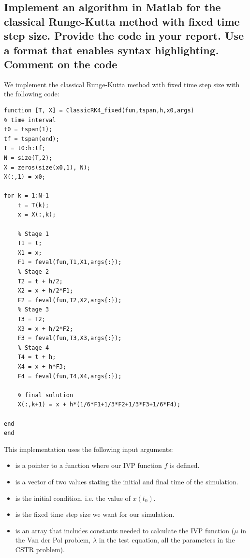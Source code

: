 
\subsection{Implement an algorithm in Matlab for the classical Runge-Kutta method with fixed time step size. Provide the code in your report.  Use a format that enables syntax highlighting. Comment on the code}
We implement the classical Runge-Kutta method with fixed time step size with the following code:
\begin{lstlisting}[caption = Classical Runge-Kutta method with fixed time step size, captionpos=b, label=1_ClassicRK4]
function [T, X] = ClassicRK4_fixed(fun,tspan,h,x0,args)
% time interval
t0 = tspan(1);
tf = tspan(end);
T = t0:h:tf;
N = size(T,2);
X = zeros(size(x0,1), N);
X(:,1) = x0;

for k = 1:N-1
    t = T(k);
    x = X(:,k);

    % Stage 1
    T1 = t;
    X1 = x;
    F1 = feval(fun,T1,X1,args{:});
    % Stage 2
    T2 = t + h/2;
    X2 = x + h/2*F1;
    F2 = feval(fun,T2,X2,args{:});
    % Stage 3
    T3 = T2;
    X3 = x + h/2*F2;
    F3 = feval(fun,T3,X3,args{:});
    % Stage 4
    T4 = t + h;
    X4 = x + h*F3;
    F4 = feval(fun,T4,X4,args{:});

    % final solution
    X(:,k+1) = x + h*(1/6*F1+1/3*F2+1/3*F3+1/6*F4);

end
end
\end{lstlisting}

This implementation uses the following input arguments:
\begin{itemize}
    \item {} is a pointer to a function where our IVP function $f$ is defined.
    \item {} is a vector of two values stating the initial and final time of the simulation.
    \item {} is the initial condition, i.e. the value of $x(t_0)$.
    \item {} is the fixed time step size we want for our simulation.
    \item {} is an array that includes constants needed to calculate the IVP function ($\mu$ in the Van der Pol problem, $\lambda$ in the test equation, all the parameters in the CSTR problem).
\end{itemize}


